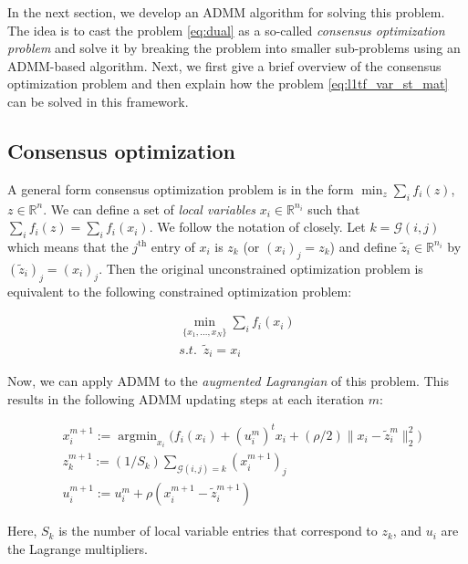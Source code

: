 \documentclass{article}
\DeclareMathOperator*{\argmin}{argmin}
\begin{document}
In the next section, we develop an ADMM algorithm for solving this problem. The idea is to cast the problem \eqref{eq:dual} as a so-called \textit{consensus optimization problem} \citep{boyd_distributed_2011} and solve it by breaking the problem into smaller sub-problems using an ADMM-based algorithm. Next, we first give a brief overview of the consensus optimization problem and then explain how the problem \eqref{eq:l1tf_var_st_mat} can be solved in this framework.

\subsection{Consensus optimization}
\label{sec:consOpt}

A general form consensus optimization problem is in the form $\min_z \sum_i f_i(z)$, $z\in\mathbb{R}^n$. We can define a set of \textit{local variables} $x_i\in \mathbb{R}^{n_i}$ such that $\sum_i f_i(z)=\sum_i f_i(x_i)$. We follow the notation of \citep{boyd_distributed_2011} closely. Let $k=\mathscr{G}(i,j)$ which means that the $j^\text{th}$ entry of $x_i$ is $z_k$ (or $(x_i)_j=z_k$) and define $\tilde{z}_i \in \mathbb{R}^{n_i}$ by $(\tilde{z}_i)_j=(x_i)_j$. Then the original unconstrained optimization problem is equivalent to the following constrained optimization problem:

\begin{equation}
\begin{aligned}
\min_{\{x_1,...,x_N  \}} \sum_i f_i(x_i)\\
 s.t. \,\,\, \tilde{z}_i=x_i \,\,\,\,\,\,
\end{aligned}
\end{equation}

Now, we can apply ADMM to the \textit{augmented Lagrangian} of this problem. This results in the following ADMM updating steps at each iteration $m$:

\begin{equation}
\begin{aligned}
& x_i^{m+1}:=\argmin_{x_i} \bigg( f_i(x_i) + (u_i^m)^t x_i + (\rho/2) \lVert x_i-\tilde{z}_i^m \lVert_2^2\bigg)\\
& z_k^{m+1}:=(1/S_k)\sum_{\mathscr{G}(i,j)=k} (x_i^{m+1})_j\\
& u_i^{m+1}:=u_i^m + \rho (x_i^{m+1}-\tilde{z}_i^{m+1})
\end{aligned}
\label{eq:ADMM_steps}
\end{equation}

Here, $S_k$ is the number of local variable entries that correspond to $z_k$, and $u_i$ are the Lagrange multipliers. 
\end{document}
